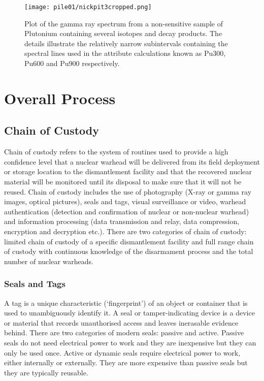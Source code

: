 \documentclass[twoside,titlepage,11pt,twocolumn,a4paper]{article}
\begin{document}
\begin{figure}
  \texttt{[image: pile01/nickpit3cropped.png]}
  \caption{Plot of the gamma ray spectrum from a non-sensitive sample
    of Plutonium containing several isotopes and decay products. The
    details illustrate the relatively narrow subintervals containing
    the spectral lines used in the attribute calculations known as
    Pu300, Pu600 and Pu900 respectively. \citep{wolford2000}}
\end{figure}

\section{Overall Process}
\subsection{Chain of Custody}
Chain of custody refers to the system of routines used to provide a
high confidence level that a nuclear warhead will be delivered from
its field deployment or storage location to the dismantlement facility
and that the recovered nuclear material will be monitored until its
disposal to make sure that it will not be reused.
\citep{zarimpas2003} Chain of custody includes the use of photography
(X-ray or gamma ray images, optical pictures), seals and tags, visual
surveillance or video, warhead authentication (detection and
confirmation of nuclear or non-nuclear warhead) and information
processing (data transmission and relay, data compression, encryption
and decryption etc.). There are two categories of chain of custody:
limited chain of custody of a specific dismantlement facility and full
range chain of custody with continuous knowledge of the disarmament
process and the total number of nuclear warheads. \citep{wuwen2004}

\subsubsection{Seals and Tags}
A tag is a unique characteristic (`fingerprint') of an object or
container that is used to unambiguously identify it. A seal or
tamper-indicating device is a device or material that records
unauthorised access and leaves inerasable evidence behind. There are
two categories of modern seals: passive and active. Passive seals do
not need electrical power to work and they are inexpensive but they
can only be used once. Active or dynamic seals require electrical
power to work, either internally or externally. They are more
expensive than passive seals but they are typically reusable.
\citep{nuclearTamperSeals2001}
\end{document}
